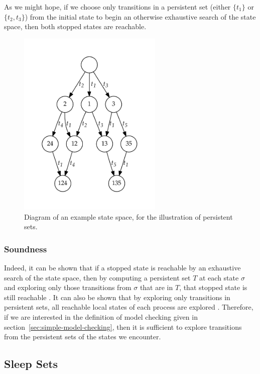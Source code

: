 \documentclass[12pt,a4paper,twoside,openright]{report}
\begin{document}
As we might hope, if we choose only transitions
in a persistent set (either $\{t_1\}$ or $\{t_2, t_3\}$)
from the initial state to begin
an otherwise exhaustive search of the state space, then
both stopped states are reachable.

\begin{figure}
	\centering
	\includegraphics[height=9cm]{persistent1}
	\caption{Diagram of an example state space, for
		the illustration of persistent sets.}
	\label{fig:persistent}
\end{figure}

\subsubsection{Soundness}
Indeed, it can be shown that if a stopped state is reachable by an exhaustive
search of the state space, then by computing a persistent set $T$ at
each state $\sigma$ and exploring only those transitions from
$\sigma$ that are in $T$, that stopped state is still reachable
\cite[Theorem~4.3]{god96}. It can also be shown
that by exploring only transitions in persistent sets, all reachable
local states of each process are explored
\cite[Theorem~6.14]{god96}. Therefore, if we are interested in
the definition of model checking given in 
section~\ref{sec:simple-model-checking}, then it is sufficient
to explore transitions from the persistent sets of the states we
encounter.

\subsection{Sleep Sets}
\end{document}

